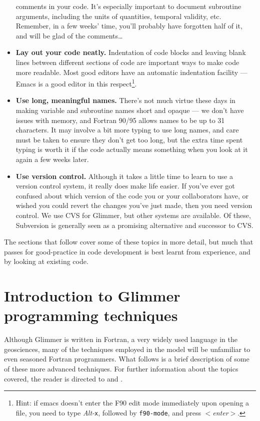 \begin{itemize}
  comments in your code. It's especially important to document subroutine
  arguments, including the units of quantities, temporal validity,
  etc. Remember, in a few weeks' time, you'll probably have forgotten half of
  it, and will be glad of the comments\ldots
\item \textbf{Lay out your code neatly.} Indentation of code blocks and leaving blank lines
  between different sections of code are important ways to make code
  more readable. Most good editors have an automatic indentation facility ---
  Emacs is a good editor in this respect\footnote{Hint: if emacs doesn't enter
  the F90 edit mode immediately upon opening a file, you need to type \emph{Alt-}\texttt{x},
  followed by \texttt{f90-mode}, and press \emph{$<$enter$>$}.}.
\item \textbf{Use long, meaningful names.} There's not much virtue these days
  in making variable and subroutine names short and opaque --- we don't have
  issues with memory, and Fortran 90/95 allows names to be up to 31
  characters. It may involve a bit more typing to use long names, and care
  must be taken to ensure they don't get too long, but the extra time spent
  typing is worth it if the code actually means something when you look at it
  again a few weeks later.
\item \textbf{Use version control.} Although it takes a little time to learn
  to use a version control system, it really does make life easier. If you've
  ever got confused about which version of the code you or your collaborators
  have, or wished you could revert the changes you've just made, then you need
  version control. We use CVS for Glimmer, but other systems are available. Of
  these, Subversion is generally seen as a promising alternative and successor
  to CVS.
\end{itemize}
The sections that follow cover some of these topics in more detail, but much
that passes for good-practice in code development is best learnt from
experience, and by looking at existing code.
%
\section{Introduction to Glimmer programming techniques}
%
Although Glimmer is written in Fortran, a very widely used language in the
geosciences, many of the techniques employed in the model will be unfamiliar
to even seasoned Fortran programmers. What follows is a brief description of
some of these more advanced techniques. For further information about the
topics covered, the reader is directed to \cite{Metcalf1999} and \cite{Decyk1997}.
%
